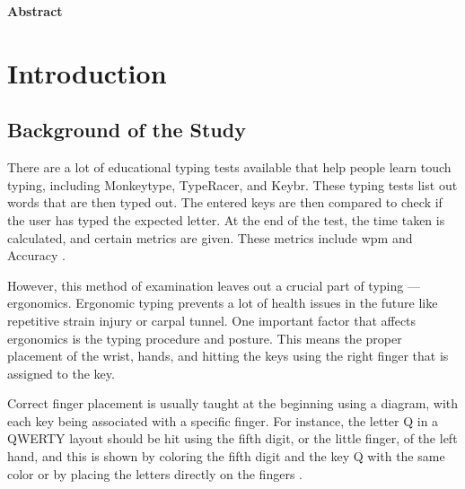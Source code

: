 \documentclass{report}
\begin{document}
\newpage

\begin{center}
	\LARGE\textbf{Abstract}
\end{center}


\newpage

\printacronyms{}
\newpage

\listoftables
\newpage

\listoffigures
\newpage

\listofequations

\newpage

\tableofcontents
\newpage


\chapter{Introduction}


\section{Background of the Study}
There are a lot of educational typing tests available that help people learn
touch typing, including Monkeytype, TypeRacer, and Keybr. These typing tests
list out words that are then typed out. The entered keys are then compared to
check if the user has typed the expected letter. At the end of the test, the
time taken is calculated, and certain metrics are given. These metrics include
\ac{wpm} and Accuracy \parencite{bartnik2021}.

However, this method of examination leaves out a crucial part of typing —
ergonomics. Ergonomic typing prevents a lot of health issues in the future like
repetitive strain injury or carpal tunnel. One important factor that affects
ergonomics is the typing procedure and posture. This means the proper placement of
the wrist, hands, and hitting the keys using the right finger that is assigned
to the key.

Correct finger placement is usually taught at the beginning using a diagram,
with each key being associated with a specific finger. For instance, the letter
Q in a QWERTY layout should be hit using the fifth digit, or the little finger,
of the left hand, and this is shown by coloring the fifth digit and the key Q
with the same color or by placing the letters directly on the fingers
\parencite{dobson2009touch}.
\end{document}
